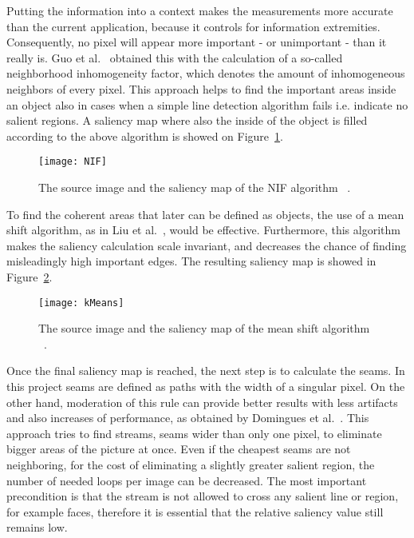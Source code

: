 \documentclass[draft,final]{vutinfth} %
\begin{document}
	Putting the information into a context makes the measurements more accurate than the current application, because it controls for information extremities.
	Consequently, no pixel will appear more important - or unimportant - than it really is.
	Guo et al.~\cite{guo2015nif} obtained this with the calculation of a so-called neighborhood inhomogeneity factor, which denotes the amount of inhomogeneous neighbors of every pixel. 
	This approach helps to find the important areas inside an object also in cases when a simple line detection algorithm fails i.e. indicate no salient regions.
	A saliency map where also the inside of the object is filled according to the above algorithm is showed on Figure~\ref{fig:nif}.
	\begin{figure}[h]
		\centering		
		\texttt{[image: NIF]}
		\caption{The source image and the saliency map of the NIF algorithm ~\cite{guo2015nif}. }
		\label{fig:nif}
	\end{figure}
	To find the coherent areas that later can be defined as objects, the use of a mean shift algorithm, as in Liu et al.~\cite{liu2006region}, would be effective. 
	Furthermore, this algorithm makes the saliency calculation scale invariant, and decreases the chance of finding misleadingly high important edges.
	The resulting saliency map is showed in Figure~\ref{fig:kmean}.\par
	\begin{figure}[h]
		\centering		
		\texttt{[image: kMeans]}
		\caption{The source image and the saliency map of the mean shift algorithm ~\cite{liu2006region}. }
		\label{fig:kmean}
	\end{figure} 
	Once the final saliency map is reached, the next step is to calculate the seams.
	In this project seams are defined as paths with the width of a singular pixel.
	On the other hand, moderation of this rule can provide better results with less artifacts and also increases of performance, as obtained by Domingues et al.~\cite{domingues2010stream}.
	This approach tries to find streams, seams wider than only one pixel, to eliminate bigger areas of the picture at once.
	Even if the cheapest seams are not neighboring, for the cost of eliminating a slightly greater salient region, the number of needed loops per image can be decreased.
	The most important precondition is that the stream is not allowed to cross any salient line or region, for example faces, therefore it is essential that the relative saliency value still remains low. \par
\end{document}
